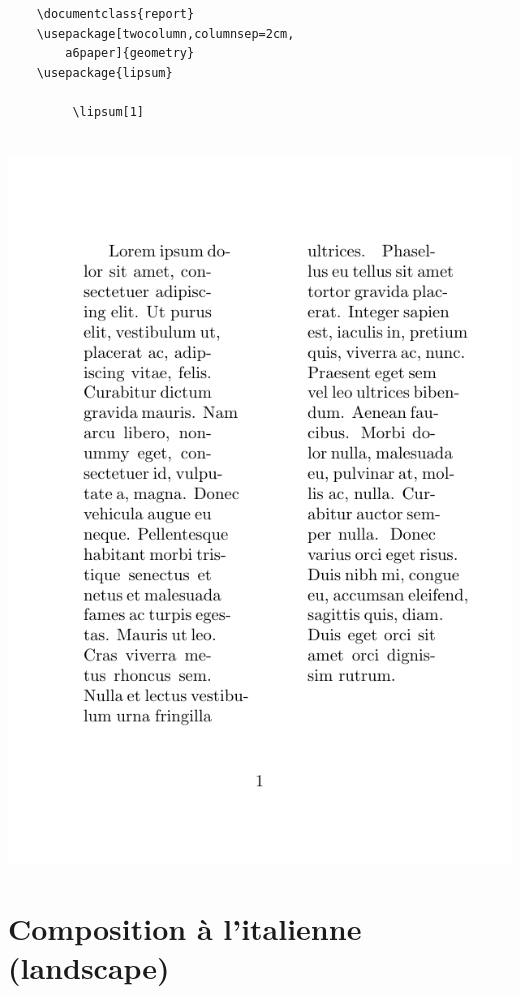 \vspace{1em}
\begin{minipage}{.48\linewidth}
    \begin{verbatim}
    \documentclass{report}
    \usepackage[twocolumn,columnsep=2cm,
        a6paper]{geometry}
    \usepackage{lipsum}
    
         \lipsum[1]
    
    \end{verbatim}
\end{minipage}
\begin{boxedminipage}{.48\linewidth}
	\includegraphics[scale=.6]{images/choix_extensions_exemple_colonnes}
\end{boxedminipage}





\section{Composition à l'italienne (landscape)}



